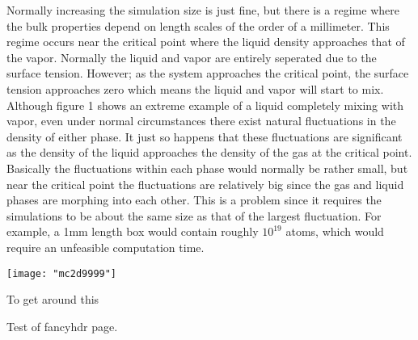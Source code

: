 Normally increasing the simulation size is just fine, but there is a regime where the bulk properties depend on length scales of the order of a millimeter. This regime occurs near the critical point where the liquid density approaches that of the vapor. Normally the liquid and vapor are entirely seperated due to the surface tension. However; as the system approaches the critical point, the surface tension approaches zero which means the liquid and vapor will start to mix. Although figure 1 shows an extreme example of a liquid completely mixing with vapor, even under normal circumstances there exist natural fluctuations in the density of either phase. It just so happens that these fluctuations are significant as the density of the liquid approaches the density of the gas at the critical point. Basically the fluctuations within each phase would normally be rather small, but near the critical point the fluctuations are relatively big since the gas and liquid phases are morphing into each other. This is a problem since it requires the simulations to be about the same size as that of the largest fluctuation. For example, a 1mm length box would contain roughly $10^{19}$ atoms, which would require an unfeasible computation time.

\texttt{[image: "mc2d9999"]}

To get around this 



\newpage

Test of fancyhdr page.
